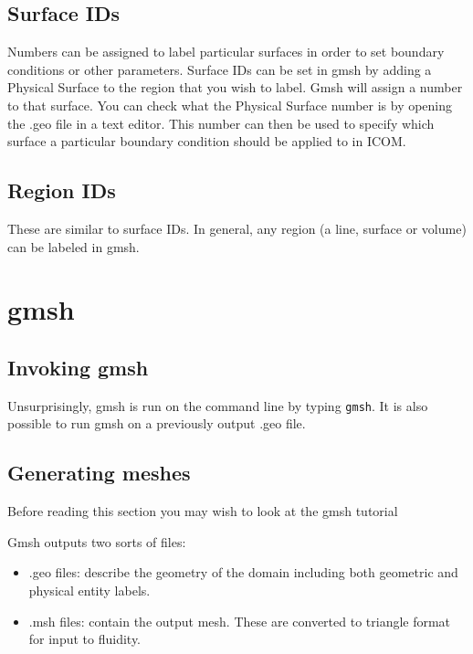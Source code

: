\subsection{Surface IDs}\label{sect:surface_ids}
Numbers can be assigned to label particular surfaces in order to set boundary conditions or other parameters.  Surface IDs can be set in gmsh by adding a Physical Surface to the region that you wish to label.  Gmsh will assign a number to that surface.  You can check what the Physical Surface number is by opening the .geo file in a text editor.  This number can then be used to specify which surface a particular boundary condition should be applied to in ICOM.

\subsection{Region IDs}\label{sect:region_ids}
These are similar to surface IDs. In general, any region (a line, surface or volume) can be labeled in gmsh.

\section{gmsh}
\label{sect:gmsh}
\subsection{Invoking gmsh}
Unsurprisingly, gmsh is run on the command line by typing
\lstinline[language=Python]{gmsh}. It is also possible to run gmsh on a
previously output .geo file.

\subsection{Generating meshes}
Before reading this section you may wish to look at the gmsh tutorial

Gmsh outputs two sorts of files:

\begin{itemize}
\item .geo files: describe the geometry of the domain including both geometric and physical entity labels. 
\item .msh files: contain the output mesh. These are converted to triangle format for input to fluidity. 
\end{itemize}

